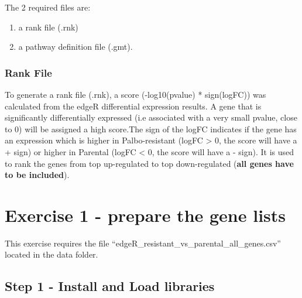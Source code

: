 \documentclass[
]{book}
\providecommand{\tightlist}{%
  \setlength{\itemsep}{0pt}\setlength{\parskip}{0pt}}
\begin{document}
The 2 required files are:

\begin{enumerate}
\def\labelenumi{\arabic{enumi}.}
\tightlist
\item
  a rank file (.rnk)
\item
  a pathway definition file (.gmt).
\end{enumerate}

\subsubsection{Rank File}\label{rank-file}

To generate a rank file (.rnk), a score (-log10(pvalue) * sign(logFC)) was calculated from the edgeR differential expression results. A gene that is significantly differentially expressed (i.e associated with a very small pvalue, close to 0) will be assigned a high score.The sign of the logFC indicates if the gene has an expression which is higher in Palbo-resistant (logFC \textgreater{} 0, the score will have a + sign) or higher in Parental (logFC \textless{} 0, the score will have a - sign). It is used to rank the genes from top up-regulated to top down-regulated (\textbf{all genes have to be included}).

\section{Exercise 1 - prepare the gene lists}\label{exercise-1-ranked}

This exercise requires the file ``edgeR\_resistant\_vs\_parental\_all\_genes.csv'' located in the data folder.

\subsection{Step 1 - Install and Load libraries}\label{step-1---install-and-load-libraries-1}
\end{document}
